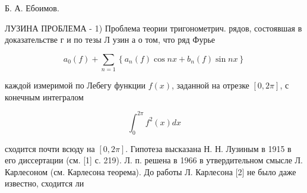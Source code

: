 \documentclass[10pt]{article}
\begin{document}
Б. А. Ебоимов.



ЛУЗИНА ПРОБЛЕМА - 1) Проблема теории тригонометрич. рядов, состоявшая в доказательстве г и по тезы Л узин а о том, что ряд Фурье



\[

a_{0}(f)+\sum_{n=1}\left\{a_{n}(f) \cos n x+b_{n}(f) \sin n x\right\}

\]



каждой измеримой по Лебегу функции $f(x)$, заданной на отрезке $[0,2 \pi]$, с конечным интегралом



\[

\int_{0}^{2 \pi} f^{2}(x) d x

\]



сходится почти всюду на $[0,2 \pi]$. Гипотеза высказана Н. Н. Лузиным в 1915 в его диссертации (см. [1] с. 219). Л. п. решена в 1966 в утвердительном смысле Л. Карлесоном (см. Карлесона теорема). До работы Л. Карлесона [2] не было даже известно, сходится ли
\end{document}
